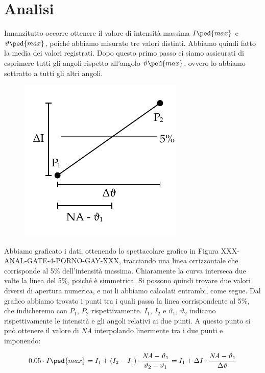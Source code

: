 \section{Analisi}

Innanzitutto occorre ottenere il valore di intensità massima $I\ped{max}$ e $\vartheta\ped{max}$, poiché abbiamo misurato tre valori distinti.
Abbiamo quindi fatto la media dei valori registrati. Dopo questo primo passo ci siamo assicurati di esprimere tutti gli angoli rispetto
all'angolo $\vartheta\ped{max}$, ovvero lo abbiamo sottratto a tutti gli altri angoli.

\begin{figure}
  \begin{center}
    \includegraphics{drawing.pdf}
  \end{center}
\end{figure}

Abbiamo graficato i dati, ottenendo lo spettacolare grafico in Figura XXX-ANAL-GATE-4-PORNO-GAY-XXX, tracciando una linea orrizzontale
che corrisponde al 5\% dell'intensità massima. Chiaramente la curva interseca due volte la linea del 5\%, poiché è simmetrica.
Si possono quindi trovare due valori diversi di apertura numerica, e noi li abbiamo calcolati entrambi, come segue.
Dal grafico abbiamo trovato i punti tra i quali passa la linea corrispondente al 5\%,
che indicheremo con $P_1$, $P_2$ rispettivamente. $I_1$, $I_2$ e $\vartheta_1$, $\vartheta_2$ indicano rispettivamente le intensità e gli angoli
relativi ai due punti. A questo punto si può ottenere il valore di \emph{NA} interpolando linermente tra i due punti e imponendo:

\begin{equation}
        0.05 \cdot I\ped{max} = I_1 + (I_2 - I_1) \cdot \frac{\emph{NA} - \vartheta_1}{\vartheta_2 - \vartheta_1} \\
                              = I_1 + \Delta I \cdot \frac{\emph{NA} - \vartheta_1}{\Delta \vartheta}
\end{equation}


